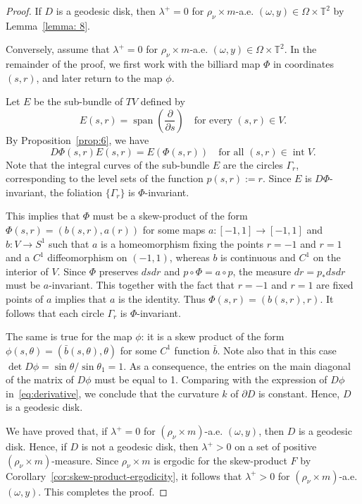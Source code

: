 \documentclass[a4paper,12pt,reqno]{amsart}
\numberwithin{equation}{section}
\newcommand{\Tt}{{\mathbb{T}}}
\begin{document}
\begin{proof}
If $D$ is a geodesic disk, then $\lambda^+ = 0$ for $\rho_\nu \times m$-a.e. $(\omega,y) \in \Omega \times \Tt^2$ by Lemma~\ref{lemma: 8}.

Conversely, assume that $\lambda^+ = 0$ for $\rho_\nu \times m$-a.e. $(\omega,y) \in \Omega \times \Tt^2$. In the remainder of the proof, we first work with the billiard map $\Phi$ in coordinates $(s,r)$, and later return to the map $\phi$. 

Let $E$ be the sub-bundle of $TV$ defined by 
\[
E(s,r) = \operatorname{span} \left(\frac{\partial}{\partial s}\right) \quad \text{for every } (s,r) \in V.
\]
By Proposition~\ref{prop:6}, we have 
\[
D \Phi(s,r) E(s,r) = E(\Phi(s,r)) \quad \text{for all } (s,r) \in \operatorname{int} V. 
\]
Note that the integral curves of the sub-bundle $E$ are the circles $\Gamma_r$, corresponding to the level sets of the function $p(s,r):=r$. Since $E$ is $D \Phi$-invariant, the foliation $\{\Gamma_r\}$ is $\Phi$-invariant.

This implies that $\Phi$ must be a skew-product of the form $\Phi(s,r) = (b(s,r),a(r))$ for some maps $a \colon [-1,1] \to [-1,1]$ and $b \colon V \to S^1$ such that $a$ is a homeomorphism fixing the points $r=-1$ and $r=1$ and a $C^1$ diffeomorphism on $(-1,1)$, whereas $b$ is continuous and $C^1$ on the interior of $V$. Since $\Phi$ preserves $ds dr$ and $p \circ \Phi = a \circ p$, the measure $dr = p_* ds dr$ must be $a$-invariant. This together with the fact that $r=-1$ and $r=1$ are fixed points of $a$ implies that $a$ is the identity. Thus $\Phi(s,r)=(b(s,r),r)$. It follows that each circle $\Gamma_r$ is $\Phi$-invariant.  
	
The same is true for the map $\phi$: it is a skew product of the form $\phi(s,\theta)=(\bar{b}(s,\theta),\theta)$ for some $C^1$ function $\bar{b}$. Note also that in this case $\det D \phi=\sin \theta/\sin \theta_1 = 1$. As a consequence, the entries on the main diagonal of the matrix of $D \phi$ must be equal to 1. Comparing with the expression of $D\phi$ in~\eqref{eq:derivative}, we 
conclude that the curvature $k$ of $\partial D$ is constant. Hence, $D$ is a geodesic disk.

We have proved that, if $\lambda^+=0$ for $(\rho_\nu\times m)$-a.e. $(\omega,y)$, then $D$ is a geodesic disk. Hence, if $D$ is not a geodesic disk, then $\lambda^+>0$ on a set of positive $(\rho_\nu\times m)$-measure. Since $\rho_\nu\times m$ is ergodic for the skew-product $F$ by Corollary~\ref{cor:skew-product-ergodicity}, it follows that $\lambda^+>0$ for $(\rho_\nu\times m)$-a.e. $(\omega,y)$. This completes the proof.
\end{proof}
\end{document}
